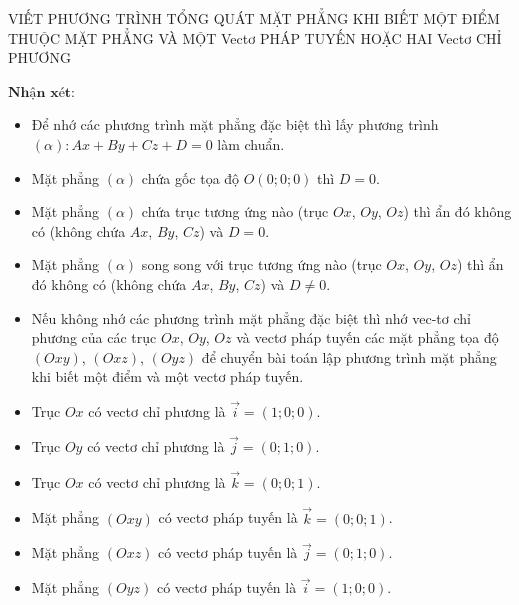 \begin{dang}{VIẾT PHƯƠNG TRÌNH TỔNG QUÁT MẶT PHẲNG KHI BIẾT MỘT ĐIỂM THUỘC MẶT PHẲNG VÀ MỘT Vectơ PHÁP TUYẾN HOẶC HAI Vectơ CHỈ PHƯƠNG}
\begin{enumerate}[a.]
\end{enumerate}
$\textbf{Nhận xét:}$
\begin{itemize}
\item Để nhớ các phương trình mặt phẳng đặc biệt thì lấy phương trình $\left(\alpha\right) \colon Ax+By+Cz+D=0$  làm chuẩn.
\item[+] Mặt phẳng $\left(\alpha\right)$ chứa gốc tọa độ $O\left(0;0;0\right)$ thì $D=0$.
\item[+] Mặt phẳng $\left(\alpha\right)$ chứa trục tương ứng nào (trục $Ox$, $Oy$, $Oz$) thì ẩn đó không có (không chứa $Ax$, $By$, $Cz$) và $D=0$.
\item[+] Mặt phẳng $\left(\alpha\right)$ song song với trục tương ứng nào (trục $Ox$, $Oy$, $Oz$) thì ẩn đó không có (không chứa $Ax$, $By$, $Cz$) và $D \neq 0$.
\item Nếu không nhớ các phương trình mặt phẳng đặc biệt thì nhớ vec-tơ chỉ phương của các trục $Ox$, $Oy$, $Oz$ và vectơ pháp tuyến các mặt phẳng tọa độ $\left(Oxy\right)$, $\left(Oxz\right)$, $\left(Oyz\right)$ để chuyển bài toán lập phương trình mặt phẳng khi biết một điểm và một vectơ pháp tuyến.
\item[+] Trục $Ox$ có vectơ chỉ phương là $\overrightarrow{i} = \left(1;0;0\right)$.
\item[+] Trục $Oy$ có vectơ chỉ phương là $\overrightarrow{j} = \left(0;1;0\right)$.
\item[+] Trục $Ox$ có vectơ chỉ phương là $\overrightarrow{k} = \left(0;0;1\right)$.
\item[+] Mặt phẳng $\left(Oxy\right)$ có vectơ pháp tuyến là $\overrightarrow{k} = \left(0;0;1\right)$.
\item[+] Mặt phẳng $\left(Oxz\right)$ có vectơ pháp tuyến là $\overrightarrow{j} = \left(0;1;0\right)$.
\item[+] Mặt phẳng $\left(Oyz\right)$ có vectơ pháp tuyến là $\overrightarrow{i} = \left(1;0;0\right)$.
\end{itemize}
\end{dang}


